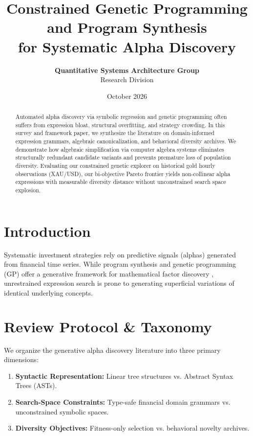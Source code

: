\documentclass[journal,10pt,twocolumn]{article}
\title{\textbf{Constrained Genetic Programming and Program Synthesis\\for Systematic Alpha Discovery}}
\author{\textbf{Quantitative Systems Architecture Group}\\Research Division}
\date{October 2026}
\begin{document}
\maketitle

\begin{abstract}
Automated alpha discovery via symbolic regression and genetic programming often suffers from expression bloat, structural overfitting, and strategy crowding. In this survey and framework paper, we synthesize the literature on domain-informed expression grammars, algebraic canonicalization, and behavioral diversity archives. We demonstrate how algebraic simplification via computer algebra systems eliminates structurally redundant candidate variants and prevents premature loss of population diversity. Evaluating our constrained genetic explorer on historical gold hourly observations (XAU/USD), our bi-objective Pareto frontier yields non-collinear alpha expressions with measurable diversity distance without unconstrained search space explosion.
\end{abstract}

\section{Introduction}
Systematic investment strategies rely on predictive signals (alphas) generated from financial time series. While program synthesis and genetic programming (GP) offer a generative framework for mathematical factor discovery \cite{koza1994genetic}, unrestrained expression search is prone to generating superficial variations of identical underlying concepts.

\section{Review Protocol \& Taxonomy}
We organize the generative alpha discovery literature into three primary dimensions:
\begin{enumerate}
    \item \textbf{Syntactic Representation:} Linear tree structures vs. Abstract Syntax Trees (ASTs).
    \item \textbf{Search-Space Constraints:} Type-safe financial domain grammars vs. unconstrained symbolic spaces.
    \item \textbf{Diversity Objectives:} Fitness-only selection vs. behavioral novelty archives.
\end{enumerate}
\end{document}
